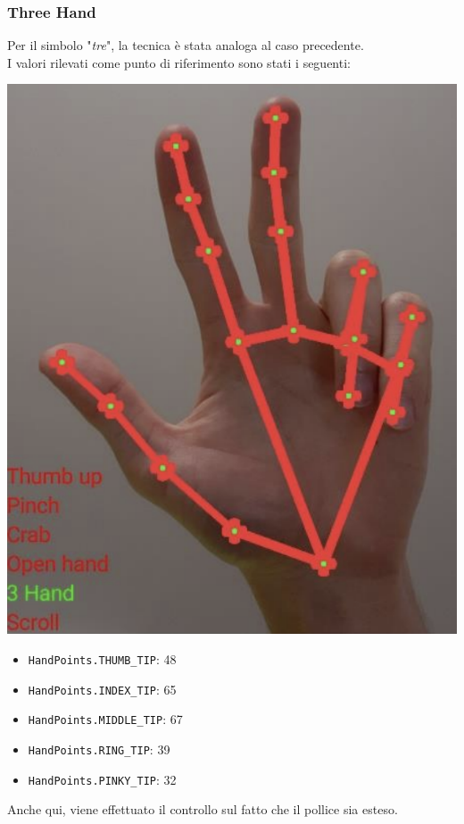 \newpage
\subsubsection{Three Hand}
Per il simbolo "\textit{tre}", la tecnica è stata analoga al caso precedente.\\
I valori rilevati come punto di riferimento sono stati i seguenti:
\begin{multicols}{2}
    \begin{multicolfigure}
        \centering
        \includegraphics[width=\textwidth]{images/three_hand.png}
    \end{multicolfigure}
    \columnbreak
    \begin{itemize}
        \item \texttt{HandPoints.THUMB\_TIP}: 48
        \item \texttt{HandPoints.INDEX\_TIP}: 65
        \item \texttt{HandPoints.MIDDLE\_TIP}: 67
        \item \texttt{HandPoints.RING\_TIP}: 39
        \item \texttt{HandPoints.PINKY\_TIP}: 32
    \end{itemize} 
\end{multicols}
\noindent Anche qui, viene effettuato il controllo sul fatto che il pollice sia esteso.


